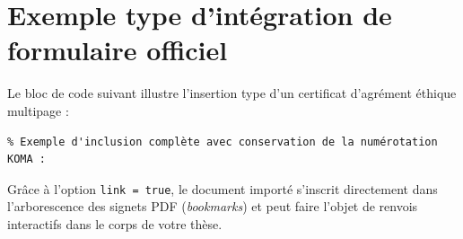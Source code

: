 \section{Exemple type d'intégration de formulaire officiel}
\label{sec:exemple_type_pdfpages}

Le bloc de code suivant illustre l'insertion type d'un certificat d'agrément éthique multipage :

\begin{singlespace}
\begin{verbatim}
% Exemple d'inclusion complète avec conservation de la numérotation KOMA :

\end{verbatim}
\end{singlespace}

Grâce à l'option \texttt{link = true}, le document importé s'inscrit directement dans l'arborescence des signets PDF (\emph{bookmarks}) et peut faire l'objet de renvois interactifs dans le corps de votre thèse.

